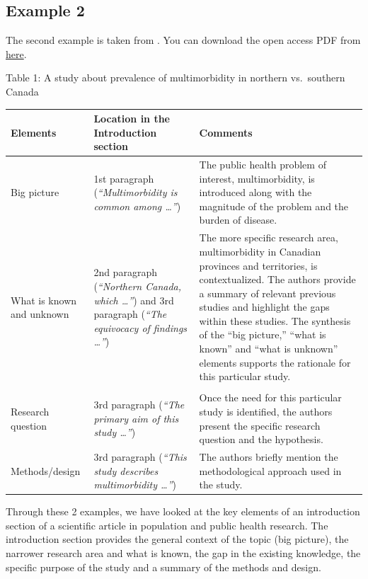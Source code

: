 \documentclass[
]{book}
\begin{document}
\hypertarget{example-2}{%
\subsection{Example 2}\label{example-2}}

The second example is taken from \citet{basham2019multimorbidity}. You can download the open access PDF from \href{https://www.tandfonline.com/doi/epub/10.1080/22423982.2019.1607703}{here}.

Table 1: A study about prevalence of multimorbidity in northern vs.~southern Canada \citep{basham2019multimorbidity}

\begin{longtable}[]{@{}
  >{\raggedright\arraybackslash}p{}
  >{\centering\arraybackslash}p{}
  >{\raggedright\arraybackslash}p{}@{}}
\toprule
Elements & Location in the Introduction section & Comments \\
\midrule
\endhead
Big picture & 1st paragraph (\emph{``Multimorbidity is common among \ldots{}''}) & The public health problem of interest, multimorbidity, is introduced along with the magnitude of the problem and the burden of disease. \\
What is known and unknown & 2nd paragraph (\emph{``Northern Canada, which \ldots{}''}) and 3rd paragraph (\emph{``The equivocacy of findings \ldots{}''}) & The more specific research area, multimorbidity in Canadian provinces and territories, is contextualized. The authors provide a summary of relevant previous studies and highlight the gaps within these studies. The synthesis of the ``big picture,'' ``what is known'' and ``what is unknown'' elements supports the rationale for this particular study. \\
& & \\
Research question & 3rd paragraph (\emph{``The primary aim of this study \ldots{}''}) & Once the need for this particular study is identified, the authors present the specific research question and the hypothesis. \\
Methods/design & 3rd paragraph (\emph{``This study describes multimorbidity \ldots{}''}) & The authors briefly mention the methodological approach used in the study. \\
\bottomrule
\end{longtable}

Through these 2 examples, we have looked at the key elements of an introduction section of a scientific article in population and public health research. The introduction section provides the general context of the topic (big picture), the narrower research area and what is known, the gap in the existing knowledge, the specific purpose of the study and a summary of the methods and design.
\end{document}
